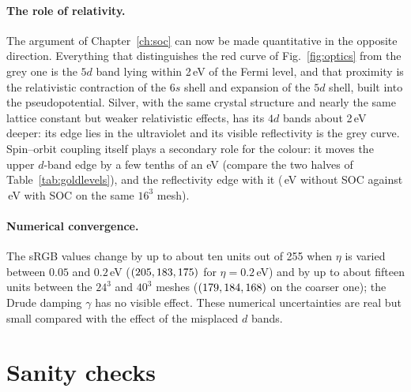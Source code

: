 \paragraph{The role of relativity.} The argument of
Chapter~\ref{ch:soc} can now be made quantitative in the opposite
direction. Everything that distinguishes the red curve of
Fig.~\ref{fig:optics} from the grey one is the $5d$ band lying within
2\,eV of the Fermi level, and that proximity is the relativistic
contraction of the $6s$ shell and expansion of the $5d$ shell, built into
the pseudopotential. Silver, with the same crystal structure and nearly
the same lattice constant but weaker relativistic effects, has its $4d$
bands about 2\,eV deeper: its edge lies in the ultraviolet and its
visible reflectivity is the grey curve. Spin--orbit coupling itself plays
a secondary role for the colour: it moves the upper $d$-band edge by a few
tenths of an eV (compare the two halves of Table~\ref{tab:goldlevels}),
and the reflectivity edge with it (\EDGENOSOC\,eV without SOC against
\EDGESOC\,eV with SOC on the same $16^3$ mesh).

\paragraph{Numerical convergence.} The sRGB values change by up to about
ten units out of 255 when $\eta$ is varied between $0.05$ and $0.2$\,eV
($(205,183,175)$ for $\eta = 0.2$\,eV) and by up to about fifteen units
between the $24^3$ and $40^3$ meshes ($(179,184,168)$ on the coarser one); the Drude
damping $\gamma$ has no visible effect. These numerical uncertainties are
real but small compared with the effect of the misplaced $d$ bands.

\section{Sanity checks}

